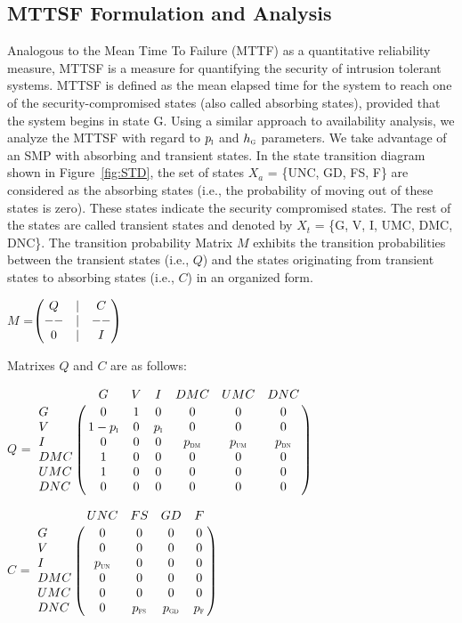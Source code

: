 \documentclass[preprint,number,12pt]{elsarticle}
\begin{document}
\subsection{MTTSF Formulation and Analysis}
Analogous to the Mean Time To Failure (MTTF) as a quantitative reliability measure, MTTSF is a measure for quantifying the security of intrusion tolerant systems\citep{Madan2004167}. MTTSF is defined as the mean elapsed time for the system to reach one of the security-compromised states (also called absorbing states), provided that the system begins in state G. Using a similar approach to availability analysis, we analyze the MTTSF with regard to $p_{\scalebox{0.5}{I}}$ and $h_{\scalebox{0.5}{G}}$ parameters. We take advantage of an SMP with absorbing and transient states. In the state transition diagram shown in Figure~\ref{fig:STD}, the set of states $X_a$ = \{UNC, GD, FS, F\} are considered as the absorbing states (i.e., the probability of moving out of these states is zero). These states indicate the security compromised states. The rest of the states are called transient states and denoted by $X_t$ = \{G, V, I, UMC, DMC, DNC\}. The transition probability Matrix $M$ exhibits the transition probabilities between the transient states (i.e., $Q$) and the states originating from transient states to absorbing states (i.e., $C$) in an organized form.

\begin{center}
{$M$} =$
\begin{pmatrix}
Q & | & C \cr
- - & | & - - \cr
0 & | & I \cr
\end{pmatrix}
$
\end{center}

Matrixes $Q$ and $C$ are as follows:

\begin{center}
{$Q$} = $\bordermatrix{
        &  G &  V &  I &  DMC  &  UMC &  DNC  \cr
      G & 0 & 1 & 0 & 0 & 0 & 0   \cr
      V & 1-p_{\scalebox{0.5}{I}} & 0 & p_{\scalebox{0.5}{I}} & 0 & 0 & 0   \cr
      I & 0 & 0 & 0 & p_{\scalebox{0.5}{DM}} & p_{\scalebox{0.5}{UM}} &    p_{\scalebox{0.5}{DN}}   \cr
      DMC & 1 & 0 & 0  & 0 & 0 & 0   \cr
      UMC & 1 & 0 & 0  & 0 & 0 & 0   \cr
      DNC & 0 & 0 & 0  & 0 & 0 & 0  \cr
                }$
\end{center}

\begin{center}
{ $C$} = $\bordermatrix{
        & UNC & FS &  GD &  F \cr
      G & 0 & 0 & 0 & 0  \cr
      V & 0 & 0 & 0 & 0   \cr
      I &  p_{\scalebox{0.5}{UN}} & 0 & 0 & 0  \cr
      DMC & 0 & 0 & 0 & 0   \cr
      UMC & 0 & 0 & 0 & 0   \cr
      DNC & 0 & p_{\scalebox{0.5}{FS}} & p_{\scalebox{0.5}{GD}} & p_{\scalebox{0.5}{F}}  \cr
            }$ 
\end{center}
\end{document}
